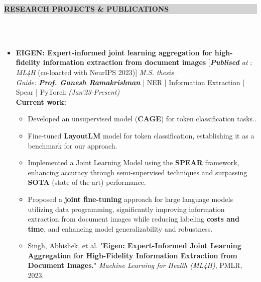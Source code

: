 \documentclass[a4paper,10.5pt]{article}
\newcommand{\lsep}{-0.5cm}
\newcommand{\resheading}[1]{{\small \colorbox{lightgray}{\begin{minipage}{0.975\textwidth}{\textbf{#1 \vphantom{p\^{E}}}}\end{minipage}}}}
\begin{document}
\resheading{\textbf{RESEARCH PROJECTS \& PUBLICATIONS}}\\[\lsep] \\[-0.4cm]

\begin{itemize}
\item \textbf{EIGEN: Expert-informed joint learning aggregation for high-fidelity information extraction from document images} \hspace{0.5cm} [\textit{\textbf{Publised} at} : \textit{ML4H} (co-loacted with NeurIPS 2023)] \hfill \emph{M.S. thesis}\\
\emph{Guide: \textbf{Prof. Ganesh Ramakrishnan}} | {NER | Information Extraction | Spear | PyTorch } \hfill \emph{(Jan'23-Present)}\\
\textbf{Current work:}\\[-0.5cm]
    \begin{itemize}[noitemsep,nolistsep]
        \item Developed an unsupervised model (\textbf{CAGE}) for token classification tasks..
        \vspace{0.07cm}
        \item Fine-tuned \textbf{LayoutLM} model for token classification, establishing it as a benchmark for our approach.
        \vspace{0.07cm}
        \item Implemented a Joint Learning Model using the \textbf{SPEAR} framework, enhancing accuracy through semi-supervised techniques and surpassing \textbf{SOTA} (state of the art) performance.
        \vspace{0.07cm}
        \item Proposed a \textbf{joint fine-tuning} approach for large language models utilizing data programming, significantly improving information extraction from document images while reducing labeling \textbf{costs and time}, and enhancing model generalizability and robustness.
        \vspace{0.07cm}
        \item Singh, Abhishek, et al. "\textbf{Eigen: Expert-Informed Joint Learning Aggregation for High-Fidelity Information Extraction from Document Images.}" \textit{Machine Learning for Health (ML4H)}, PMLR, 2023.
    \end{itemize}
\vspace{-0.1cm} 


\end{itemize}
\end{document}
